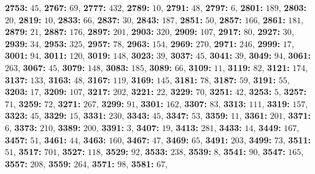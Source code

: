 \textsf{\bfseries 2753:} $45$, \textsf{\bfseries 2767:} $69$, \textsf{\bfseries 2777:} $432$, \textsf{\bfseries 2789:} $10$, \textsf{\bfseries 2791:} $48$, \textsf{\bfseries 2797:} $6$, \textsf{\bfseries 2801:} $189$, \textsf{\bfseries 2803:} $20$, \textsf{\bfseries 2819:} $10$, \textsf{\bfseries 2833:} $66$, \textsf{\bfseries 2837:} $30$, \textsf{\bfseries 2843:} $187$, \textsf{\bfseries 2851:} $50$, \textsf{\bfseries 2857:} $166$, \textsf{\bfseries 2861:} $181$, \textsf{\bfseries 2879:} $21$, \textsf{\bfseries 2887:} $176$, \textsf{\bfseries 2897:} $201$, \textsf{\bfseries 2903:} $320$, \textsf{\bfseries 2909:} $107$, \textsf{\bfseries 2917:} $80$, \textsf{\bfseries 2927:} $30$, \textsf{\bfseries 2939:} $34$, \textsf{\bfseries 2953:} $325$, \textsf{\bfseries 2957:} $78$, \textsf{\bfseries 2963:} $154$, \textsf{\bfseries 2969:} $270$, \textsf{\bfseries 2971:} $246$, \textsf{\bfseries 2999:} $17$, \textsf{\bfseries 3001:} $94$, \textsf{\bfseries 3011:} $120$, \textsf{\bfseries 3019:} $148$, \textsf{\bfseries 3023:} $39$, \textsf{\bfseries 3037:} $45$, \textsf{\bfseries 3041:} $39$, \textsf{\bfseries 3049:} $94$, \textsf{\bfseries 3061:} $263$, \textsf{\bfseries 3067:} $45$, \textsf{\bfseries 3079:} $148$, \textsf{\bfseries 3083:} $185$, \textsf{\bfseries 3089:} $66$, \textsf{\bfseries 3109:} $11$, \textsf{\bfseries 3119:} $82$, \textsf{\bfseries 3121:} $174$, \textsf{\bfseries 3137:} $133$, \textsf{\bfseries 3163:} $48$, \textsf{\bfseries 3167:} $119$, \textsf{\bfseries 3169:} $145$, \textsf{\bfseries 3181:} $78$, \textsf{\bfseries 3187:} $59$, \textsf{\bfseries 3191:} $55$, \textsf{\bfseries 3203:} $17$, \textsf{\bfseries 3209:} $107$, \textsf{\bfseries 3217:} $202$, \textsf{\bfseries 3221:} $22$, \textsf{\bfseries 3229:} $70$, \textsf{\bfseries 3251:} $42$, \textsf{\bfseries 3253:} $5$, \textsf{\bfseries 3257:} $71$, \textsf{\bfseries 3259:} $72$, \textsf{\bfseries 3271:} $267$, \textsf{\bfseries 3299:} $91$, \textsf{\bfseries 3301:} $162$, \textsf{\bfseries 3307:} $83$, \textsf{\bfseries 3313:} $111$, \textsf{\bfseries 3319:} $157$, \textsf{\bfseries 3323:} $45$, \textsf{\bfseries 3329:} $15$, \textsf{\bfseries 3331:} $230$, \textsf{\bfseries 3343:} $45$, \textsf{\bfseries 3347:} $53$, \textsf{\bfseries 3359:} $11$, \textsf{\bfseries 3361:} $201$, \textsf{\bfseries 3371:} $6$, \textsf{\bfseries 3373:} $210$, \textsf{\bfseries 3389:} $200$, \textsf{\bfseries 3391:} $3$, \textsf{\bfseries 3407:} $19$, \textsf{\bfseries 3413:} $281$, \textsf{\bfseries 3433:} $14$, \textsf{\bfseries 3449:} $167$, \textsf{\bfseries 3457:} $51$, \textsf{\bfseries 3461:} $44$, \textsf{\bfseries 3463:} $160$, \textsf{\bfseries 3467:} $47$, \textsf{\bfseries 3469:} $65$, \textsf{\bfseries 3491:} $203$, \textsf{\bfseries 3499:} $73$, \textsf{\bfseries 3511:} $51$, \textsf{\bfseries 3517:} $701$, \textsf{\bfseries 3527:} $118$, \textsf{\bfseries 3529:} $92$, \textsf{\bfseries 3533:} $238$, \textsf{\bfseries 3539:} $8$, \textsf{\bfseries 3541:} $90$, \textsf{\bfseries 3547:} $165$, \textsf{\bfseries 3557:} $208$, \textsf{\bfseries 3559:} $264$, \textsf{\bfseries 3571:} $98$, \textsf{\bfseries 3581:} $67$, 
